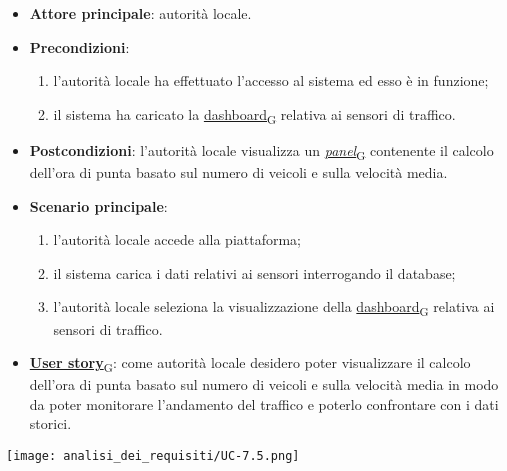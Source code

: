 \begin{itemize}
	\item \textbf{Attore principale}: autorità locale.
	\item \textbf{Precondizioni}:
	      \begin{enumerate}
		      \item l'autorità locale ha effettuato l'accesso al sistema ed esso è in funzione;
		      \item il sistema ha caricato la \href{https://7last.github.io/docs/pb/documentazione-interna/glossario\#dashboard}{dashboard\textsubscript{G}} relativa ai sensori di traffico.
	      \end{enumerate}
	\item \textbf{Postcondizioni}: l'autorità locale visualizza un \href{https://7last.github.io/docs/pb/documentazione-interna/glossario\#panel}{\textit{panel}\textsubscript{G}} contenente il calcolo dell'ora di punta basato sul numero di veicoli e sulla velocità media.
	\item \textbf{Scenario principale}:
	      \begin{enumerate}
		      \item l'autorità locale accede alla piattaforma;
		      \item il sistema carica i dati relativi ai sensori interrogando il database;
		      \item l'autorità locale seleziona la visualizzazione della \href{https://7last.github.io/docs/pb/documentazione-interna/glossario\#dashboard}{dashboard\textsubscript{G}} relativa ai sensori di traffico.
	      \end{enumerate}
	\item \href{https://7last.github.io/docs/pb/documentazione-interna/glossario\#user-story}{\textbf{User story}\textsubscript{G}}:
	      come autorità locale desidero poter visualizzare il calcolo dell'ora di punta basato sul numero di veicoli e sulla velocità media in modo da poter monitorare
	      l'andamento del traffico e poterlo confrontare con i dati storici.
\end{itemize}
\begin{center}
	\texttt{[image: analisi\_dei\_requisiti/UC-7.5.png]}
\end{center}

